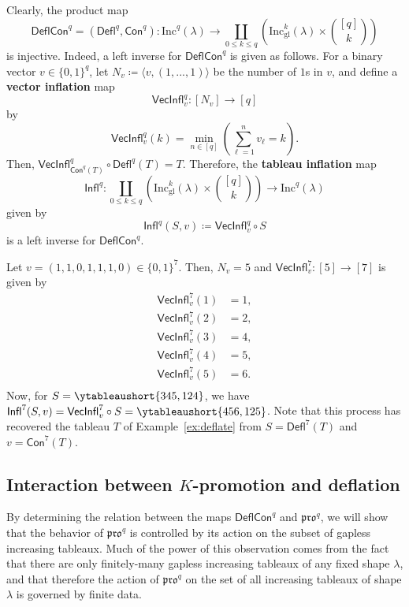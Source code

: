 \documentclass[12pt]{amsart}
\theoremstyle{definition}
\newenvironment{example}
  {\pushQED{\qed}\renewcommand{\qedsymbol}{$\diamondsuit$}\examplex}
  {\popQED\endexamplex}
\theoremstyle{remark}
\numberwithin{equation}{section}
\newcommand{\inc}{\ensuremath{\mathrm{Inc}}}
\newcommand{\incgl}{\inc_{\mathrm{gl}}}
\newcommand{\pro}{\mathfrak{pro}}
\newcommand{\deflate}{\ensuremath{\mathsf{Defl}}}
\newcommand{\inflate}{\ensuremath{\mathsf{VecInfl}}}
\newcommand{\tinflate}{\ensuremath{\mathsf{Infl}}}
\newcommand{\content}{\ensuremath{\mathsf{Con}}}
\newcommand{\compress}{\ensuremath{\mathsf{DeflCon}}}
\begin{document}
Clearly, the product map 
\[
\compress^q = (\deflate^q,\content^q) : \inc^q(\lambda) \to \coprod_{0 \leq k \leq q} \left( \incgl^k(\lambda) \times \binom{[q]}{k} \right)
\] 
is injective.
Indeed, a left inverse for $\compress^q$ is given as follows. 
For a binary vector $v \in \{0,1\}^{q}$, let $N_v \coloneqq \langle v, (1,...,1) \rangle$ be the number of $1$s in $v$, and define a {\bf vector inflation} map \[\inflate^q_v : [N_v] \to [q]\] by
\[ \inflate^q_v(k) = \min_{n \in [q]} \left( \sum_{\ell = 1}^n v_\ell = k \right).\] Then, $\inflate^q_{\content^q(T)} \circ \deflate^q(T) = T$. Therefore, the {\bf tableau inflation} map 
\[
\tinflate^q : \coprod_{0 \leq k \leq q} \left( \incgl^k(\lambda) \times \binom{[q]}{k} \right) \to \inc^q(\lambda)
\]
given by 
\[
\tinflate^q(S,v) \coloneqq \inflate^q_v \circ S
\]
 is a left inverse for $\compress^q$. 

\begin{example}\label{ex:reinflate}
Let $v = (1,1,0,1,1,1,0) \in \{0,1\}^7$. Then, $N_v = 5$ and $\inflate^7_v : [5] \to [7]$ is given by 
\begin{align*}
\inflate^7_v(1) &= 1, \\
\inflate^7_v(2) &= 2, \\
\inflate_v^7(3) &= 4, \\
\inflate_v^7(4) &= 5, \\
\inflate_v^7(5) &= 6. \\
\end{align*}
Now, for $S = \ytableaushort{345,124}$, we have $\tinflate^7(S,v) = \inflate^7_v \circ S = \ytableaushort{456,125}$. Note that this process has recovered the tableau $T$ of Example~\ref{ex:deflate} from $S=\deflate^7(T)$ and $v=\content^7(T)$.
\end{example}

\subsection{Interaction between $K$-promotion and deflation}
By determining the relation between the maps $\compress^q$ and $\pro^q$, we will show that the behavior of $\pro^q$ is controlled by its action on the subset of gapless increasing tableaux. Much of the power of this observation comes from the fact that there are only finitely-many gapless increasing tableaux of any fixed shape $\lambda$, and that therefore the action of $\pro^q$ on the set of all increasing tableaux of shape $\lambda$ is governed by finite data.
\end{document}

